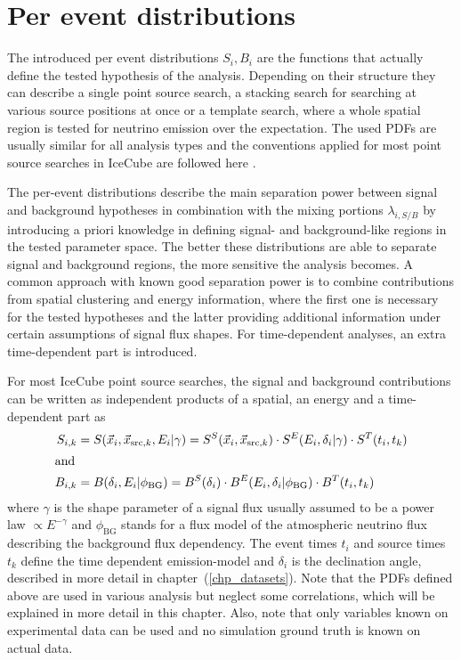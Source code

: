 \section{Per event distributions}
The introduced per event distributions $S_i, B_i$ are the functions that actually define the tested hypothesis of the analysis.
Depending on their structure they can describe a single point source search, a stacking search for searching at various source positions at once or a template search, where a whole spatial region is tested for neutrino emission over the expectation.
The used PDFs are usually similar for all analysis types and the conventions applied for most point source searches in IceCube are followed here .

The per-event distributions describe the main separation power between signal and background hypotheses in combination with the mixing portions $\lambda_{i,S/B}$ by introducing a priori knowledge in defining signal- and background-like regions in the tested parameter space.
The better these distributions are able to separate signal and background regions, the more sensitive the analysis becomes.
A common approach with known good separation power is to combine contributions from spatial clustering and energy information, where the first one is necessary for the tested hypotheses and the latter providing additional information under certain assumptions of signal flux shapes.
For time-dependent analyses, an extra time-dependent part is introduced.

For most IceCube point source searches, the signal and background contributions can be written as independent products of a spatial, an energy and a time-dependent part as
\begin{align}
  S_{i,k}
    &= S(\vec{x}_i, \vec{x}_{\mathrm{src},k}, E_i | \gamma)
     = S^S(\vec{x}_i, \vec{x}_{\mathrm{src},k}) \cdot
       S^E(E_i, \delta_i | \gamma) \cdot
       S^T(t_i, t_k) \\
  \intertext{and}
  B_{i,k}
    &= B(\delta_i, E_i | \phi_\mathrm{BG})
     = B^S(\delta_i) \cdot
       B^E(E_i, \delta_i | \phi_\mathrm{BG}) \cdot
       B^T(t_i, t_k)
\end{align}
where $\gamma$ is the shape parameter of a signal flux usually assumed to be a power law $\propto E^{-\gamma}$ and $\phi_\mathrm{BG}$ stands for a flux model of the atmospheric neutrino flux describing the background flux dependency.
The event times $t_i$ and source times $t_k$ define the time dependent emission-model and $\delta_i$ is the declination angle, described in more detail in chapter~(\ref{chp_datasets}).
Note that the PDFs defined above are used in various analysis but neglect some correlations, which will be explained in more detail in this chapter.
Also, note that only variables known on experimental data can be used and no simulation ground truth is known on actual data.

